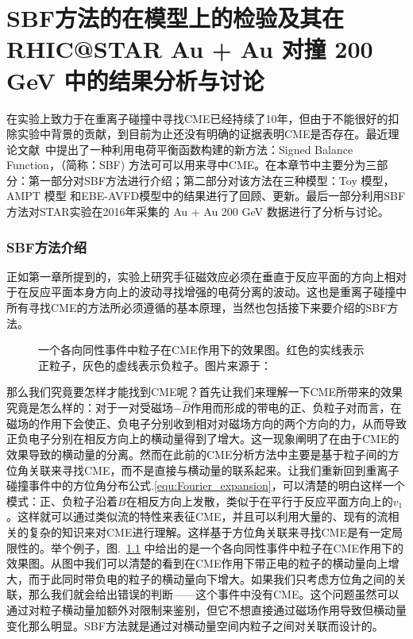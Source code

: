 
\setcounter{section}{0}

\setcounter{figure}{0}
\setcounter{table}{0}
\setcounter{equation}{0}

\chapter[SBF方法寻找CME]{SBF方法的在模型上的检验及其在RHIC@STAR Au + Au 对撞 200 GeV 中的结果分析与讨论}


在实验上致力于在重离子碰撞中寻找CME已经持续了10年，但由于不能很好的扣除实验中背景的贡献，到目前为止还没有明确的证据表明CME是否存在。最近理论文献~\cite{Tang2019}中提出了一种利用电荷平衡函数构建的新方法：Signed Balance Function，（简称：SBF) 方法可可以用来寻中CME。在本章节中主要分为三部分：第一部分对SBF方法进行介绍；第二部分对该方法在三种模型：Toy 模型，AMPT 模型 和EBE-AVFD模型中的结果进行了回顾、更新。最后一部分利用SBF方法对STAR实验在2016年采集的 Au + Au 200 GeV 数据进行了分析与讨论。

\bigskip

\subsection{SBF方法介绍}
正如第一章所提到的，实验上研究手征磁效应必须在垂直于反应平面的方向上相对于在反应平面本身方向上的波动寻找增强的电荷分离的波动。这也是重离子碰撞中所有寻找CME的方法所必须遵循的基本原理，当然也包括接下来要介绍的SBF方法。

\begin{figure}[htbp]
\centering
{}
\caption{一个各向同性事件中粒子在CME作用下的效果图。红色的实线表示正粒子，灰色的虚线表示负粒子。图片来源于：~\citep{Tang2019}}
\label{fig:Aihong_KatongChargeSeparation}
\end{figure}

那么我们究竟要怎样才能找到CME呢？首先让我们来理解一下CME所带来的效果究竟是怎么样的：对于一对受磁场$-\hat{B}$作用而形成的带电的正、负粒子对而言，在磁场的作用下会使正、负电子分别收到相对对磁场方向的两个方向的力，从而导致正负电子分别在相反方向上的横动量得到了增大。这一现象阐明了在由于CME的效果导致的横动量的分离。然而在此前的CME分析方法中主要是基于粒子间的方位角关联来寻找CME，而不是直接与横动量的联系起来。让我们重新回到重离子碰撞事件中的方位角分布公式.\ref {equ:Fourier_expansion}，可以清楚的明白这样一个模式：正、负粒子沿着$B$在相反方向上发散，类似于在平行于反应平面方向上的$v_1$。这样就可以通过类似流的特性来表征CME，并且可以利用大量的、现有的流相关的复杂的知识来对CME进行理解。这样基于方位角关联来寻找CME是有一定局限性的。举个例子，图.~\ref{fig:Aihong_KatongChargeSeparation} 中给出的是一个各向同性事件中粒子在CME作用下的效果图。从图中我们可以清楚的看到在CME作用下带正电的粒子的横动量向上增大，而于此同时带负电的粒子的横动量向下增大。如果我们只考虑方位角之间的关联，那么我们就会给出错误的判断——这个事件中没有CME。这个问题虽然可以通过对粒子横动量加额外对限制来鉴别，但它不想直接通过磁场作用导致但横动量变化那么明显。SBF方法就是通过对横动量空间内粒子之间对关联而设计的。

